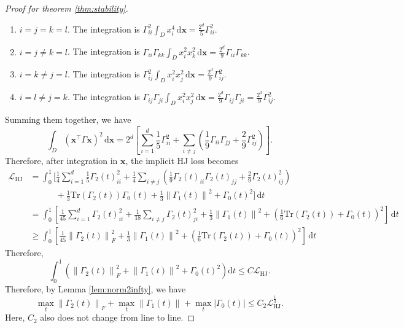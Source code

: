 \documentclass{article} %
\theoremstyle{plain}
\theoremstyle{definition}
\theoremstyle{remark}
\newcommand{\norm}[2][H^s]{\left\|#2\right\|_{#1}}
\newcommand{\bx}{\mathbf{x}}
\newcommand{\mL}{\mathcal{L}}
\newcommand{\Gl}{\Gamma_0}
\newcommand{\Gy}{\Gamma_1}
\newcommand{\Ge}{\Gamma_2}
\newcommand{\rd}{\mathrm{d}}
\newcommand{\Tr}{\mathrm{Tr}}
\newcommand{\tp}{^{\top}}
\newcommand{\parentheses}[1]{\left(#1\right)}
\newcommand{\sqbra}[1]{\left[#1\right]}
\newcommand{\abs}[1]{\left|#1\right|}
\begin{document}
\begin{proof}[Proof for theorem \ref{thm:stability}]
\begin{enumerate}
\item $i=j=k=l$. The integration is $\Gamma_{ii}^2 \int_D x_i^4 \,\rd \bx = \frac{2^d}{5} \Gamma_{ii}^2$.
\item $i=j\neq k=l$. The integration is $\Gamma_{ii}\Gamma_{kk} \int_D x_i^2x_k^2 \,\rd \bx = \frac{2^d}{9} \Gamma_{ii}\Gamma_{kk}$.
\item $i=k\neq j=l$. The integration is $\Gamma_{ij}^2 \int_D x_i^2x_j^2 \,\rd \bx = \frac{2^d}{9} \Gamma_{ij}^2$.
\item $i=l\neq j=k$. The integration is $\Gamma_{ij}\Gamma_{ji} \int_D x_i^2x_j^2 \,\rd \bx = \frac{2^d}{9} \Gamma_{ij}\Gamma_{ji} = \frac{2^d}{9} \Gamma_{ij}^2$.
\end{enumerate}
Summing them together, we have
$$\int_D (\bx\tp\Gamma \bx)^2 \,\rd \bx = 2^d \sqbra{\sum_{i=1}^d \frac{1}{5} \Gamma_{ii}^2 + \sum_{i\neq j} \parentheses{\frac19 \Gamma_{ii}\Gamma_{jj} + \frac29 \Gamma_{ij}^2}}.$$
Therefore, after integration in $\bx$, the implicit HJ loss becomes 
\begin{align*}
\mL_{\text{HJ}} & =\int_0^1 \bigg[\frac14\sum_{i=1}^d\frac15 \Ge(t)_{ii}^2 + \frac14\sum_{i\neq j} \parentheses{\frac19 \Ge(t)_{ii}\Ge(t)_{jj} + \frac29 \Ge(t)_{ij}^2} \\
& \quad \quad \quad + \frac13 \Tr(\Ge(t))\Gl(t) + \frac13 \norm[]{\Gy(t)}^2 + \Gl(t)^2\bigg] \,\rd t \\
& = \int_0^1 \sqbra{ \frac{1}{45} \sum_{i=1}^d \Ge(t)_{ii}^2  + \frac{1}{18} \sum_{i\neq j} \Ge(t)_{ji}^2 + \frac13 \norm[]{\Gy(t)}^2 + \parentheses{\frac16 \Tr(\Ge(t)) + \Gl(t)}^2} \,\rd t \\
& \ge \int_0^1 \sqbra{\frac{1}{45} \norm[F]{\Ge(t)}^2 + \frac13 \norm[]{\Gy(t)}^2 + \parentheses{\frac16 \Tr(\Ge(t)) + \Gl(t)}^2} \,\rd t
\end{align*}
Therefore,
$$\int_0^1 \parentheses{\norm[F]{\Ge(t)}^2 +  \norm[]{\Gy(t)}^2 + \Gl(t)^2} \rd t \le C \mL_{\text{HJ}}.$$
Therefore, by Lemma \ref{lem:norm2infty}, we have
\begin{equation}\label{eq:Gamma_infinity}
\max_{t} \norm[F]{\Ge(t)} + \max_{t} \norm[]{\Gy(t)}+ \max_{t}\abs{\Gl(t)} \le C_2 \mL_{\text{HJ}}^{\frac13}.
\end{equation}
Here, $C_2$ also does not change from line to line.


\end{proof}
\end{document}
